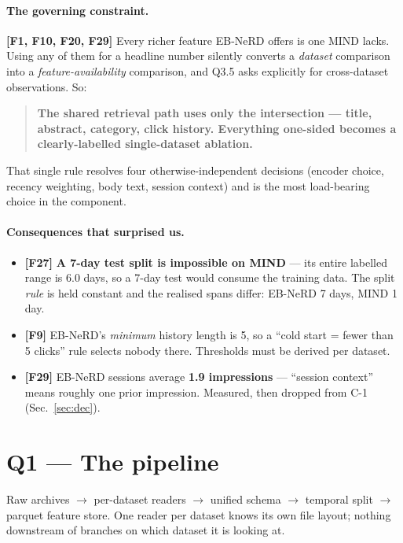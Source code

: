 \documentclass[11pt,a4paper]{article}
\newcommand{\brk}[1]{%
  \begingroup\ttfamily\hyphenchar\font=-1
  \discretionary{}{}{}%
  \expandafter\brkscan\detokenize{#1}\relax\endgroup}
\def\brkscan#1{%
  \ifx#1\relax\else
    \char`#1%
    \ifnum`#1=`/ \penalty0 \fi
    \ifnum`#1=`_ \penalty0 \fi
    \ifnum`#1=`. \penalty0 \fi
    \expandafter\brkscan
  \fi}
\newcommand{\finding}[1]{\textcolor{blue!55!black}{\textbf{[#1]}}}
\begin{document}
\paragraph{The governing constraint.} \finding{F1, F10, F20, F29}
Every richer feature EB-NeRD offers is one MIND lacks. Using any of them for a headline number
silently converts a \emph{dataset} comparison into a \emph{feature-availability} comparison, and
Q3.5 asks explicitly for cross-dataset observations. So:

\begin{quote}
\textbf{The shared retrieval path uses only the intersection --- title, abstract, category, click
history. Everything one-sided becomes a clearly-labelled single-dataset ablation.}
\end{quote}

That single rule resolves four otherwise-independent decisions (encoder choice, recency weighting,
body text, session context) and is the most load-bearing choice in the component.

\paragraph{Consequences that surprised us.}
\begin{itemize}[leftmargin=1.4em,itemsep=2pt]
  \item \finding{F27} \textbf{A 7-day test split is impossible on MIND} --- its entire labelled
        range is 6.0 days, so a 7-day test would consume the training data. The split \emph{rule}
        is held constant and the realised spans differ: EB-NeRD 7 days, MIND 1 day.
  \item \finding{F9} EB-NeRD's \emph{minimum} history length is 5, so a ``cold start = fewer than
        5 clicks'' rule selects nobody there. Thresholds must be derived per dataset.
  \item \finding{F29} EB-NeRD sessions average \textbf{1.9 impressions} --- ``session context''
        means roughly one prior impression. Measured, then dropped from C-1 (Sec.~\ref{sec:dec}).
\end{itemize}

\section{Q1 --- The pipeline}

Raw archives $\rightarrow$ per-dataset readers $\rightarrow$ unified schema $\rightarrow$ temporal
split $\rightarrow$ parquet feature store. One reader per dataset knows its own file layout;
nothing downstream of \brk{src/data/readers.py} branches on which dataset it is looking at.
\end{document}
